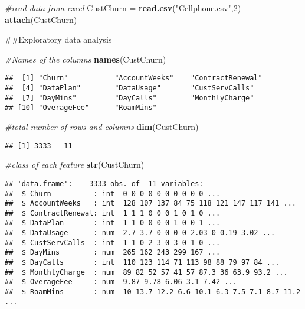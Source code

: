 \documentclass[]{article}
\newenvironment{Shaded}{\begin{snugshade}}{\end{snugshade}}
\newcommand{\KeywordTok}[1]{\textcolor[rgb]{0.13,0.29,0.53}{\textbf{#1}}}
\newcommand{\DecValTok}[1]{\textcolor[rgb]{0.00,0.00,0.81}{#1}}
\newcommand{\StringTok}[1]{\textcolor[rgb]{0.31,0.60,0.02}{#1}}
\newcommand{\CommentTok}[1]{\textcolor[rgb]{0.56,0.35,0.01}{\textit{#1}}}
\newcommand{\NormalTok}[1]{#1}
\begin{document}
\begin{Shaded}
\begin{Highlighting}[]
\CommentTok{#read data from excel}
\NormalTok{CustChurn =}\StringTok{ }\KeywordTok{read.csv}\NormalTok{(}\StringTok{"Cellphone.csv"}\NormalTok{,}\DecValTok{2}\NormalTok{)}
\KeywordTok{attach}\NormalTok{(CustChurn)}

\NormalTok{##Exploratory data analysis }


\CommentTok{#Names of the columns}
\KeywordTok{names}\NormalTok{(CustChurn)}
\end{Highlighting}
\end{Shaded}

\begin{verbatim}
##  [1] "Churn"           "AccountWeeks"    "ContractRenewal"
##  [4] "DataPlan"        "DataUsage"       "CustServCalls"  
##  [7] "DayMins"         "DayCalls"        "MonthlyCharge"  
## [10] "OverageFee"      "RoamMins"
\end{verbatim}

\begin{Shaded}
\begin{Highlighting}[]
\CommentTok{#total number of rows and columns}
\KeywordTok{dim}\NormalTok{(CustChurn)}
\end{Highlighting}
\end{Shaded}

\begin{verbatim}
## [1] 3333   11
\end{verbatim}

\begin{Shaded}
\begin{Highlighting}[]
\CommentTok{#class of each feature }
\KeywordTok{str}\NormalTok{(CustChurn)}
\end{Highlighting}
\end{Shaded}

\begin{verbatim}
## 'data.frame':    3333 obs. of  11 variables:
##  $ Churn          : int  0 0 0 0 0 0 0 0 0 0 ...
##  $ AccountWeeks   : int  128 107 137 84 75 118 121 147 117 141 ...
##  $ ContractRenewal: int  1 1 1 0 0 0 1 0 1 0 ...
##  $ DataPlan       : int  1 1 0 0 0 0 1 0 0 1 ...
##  $ DataUsage      : num  2.7 3.7 0 0 0 0 2.03 0 0.19 3.02 ...
##  $ CustServCalls  : int  1 1 0 2 3 0 3 0 1 0 ...
##  $ DayMins        : num  265 162 243 299 167 ...
##  $ DayCalls       : int  110 123 114 71 113 98 88 79 97 84 ...
##  $ MonthlyCharge  : num  89 82 52 57 41 57 87.3 36 63.9 93.2 ...
##  $ OverageFee     : num  9.87 9.78 6.06 3.1 7.42 ...
##  $ RoamMins       : num  10 13.7 12.2 6.6 10.1 6.3 7.5 7.1 8.7 11.2 ...
\end{verbatim}
\end{document}
